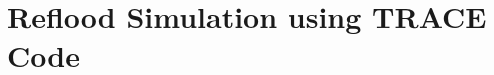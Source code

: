 \chapter[Reflood Simulation in TRACE]{Reflood Simulation using TRACE Code}\label{ch:trace_reflood}









